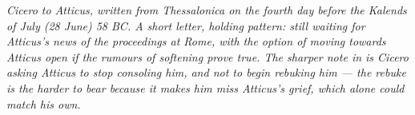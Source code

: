 
\textit{Cicero to Atticus, written from Thessalonica on the
fourth day before the Kalends of July (28 June) 58 BC. A short
letter, holding pattern: still waiting for Atticus's news of
the proceedings at Rome, with the option of moving towards
Atticus open if the rumours of softening prove true. The
sharper note in  is Cicero asking Atticus to
stop consoling him, and not to begin rebuking him --- the
rebuke is the harder to bear because it makes him miss
Atticus's grief, which alone could match his own.}
